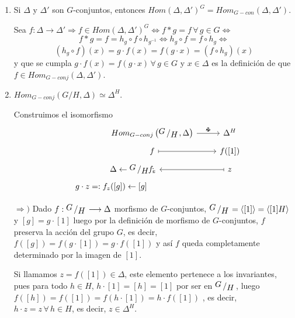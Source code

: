 \begin{enumerate}
\begin{dem}
        $$ \{\text{ptos. racionales de } L\underset{k}{\otimes} L \}  = Hom_{L-alg}(L\underset{k}{\otimes} L,L ) = Hom_{k-alg}(L,L) = G$$
    \end{dem}
    \item Si $\Delta$ y $\Delta'$ son $G$-conjuntos, entonces $Hom(\Delta, \Delta')^G = Hom_{G-con}(\Delta, \Delta')$.
    \begin{dem}
        Sea $f: \Delta \longrightarrow \Delta' \Rightarrow f\in Hom( \Delta, \Delta')^G \iff f*g=f \, \forall \, g\in G \iff$
        $$f*g=f=h_g \circ f \circ h_{g^{-1}}  \iff h_g \circ f = f \circ h_g \iff$$
        $$(h_g \circ f)(x) = g\cdot f(x) = f(g\cdot x) = (f\circ h_g)(x) $$
        y que se cumpla $g\cdot f(x) = f(g\cdot x) \, \forall \, g \in G$ y $x \in \Delta$ es la definici\'on de que $f\in Hom_{G-conj}(\Delta, \Delta')$.
    \end{dem}
    \item $Hom_{G-conj} (G/H, \Delta) \simeq \Delta^H$.
    \begin{dem}
        Construimos el isomorfismo
        $$\bt &[-30mm] Hom_{G-conj}\left(\modulo{G}{H}, \Delta \right) \rar{\Phi}{\sim} & \Delta^H \\[-5mm]
        &[-8mm] f\rarmaps & f({[1]}) \\[-5mm] 
        \hspace{18mm} \Delta \leftarrow \modulo{G}{H} : &[6mm] f_z & z\arrow[mapsto]{l} \\[-5mm] 
        g\cdot z = : f_z({[g]}) \leftarrow [g] &[-15mm]  \et$$

        $\Rightarrow)$ Dado $f : \modulo{G}{H} \longrightarrow \Delta$ morfismo de $G$-conjuntos, $\modulo{G}{H} = \langle [1]\rangle = \langle [1] H\rangle$ y $[g] = g\cdot [1]$ luego por la definici\'on de morfismo de $G$-conjuntos, $f$ preserva la acci\'on del grupo $G$, es decir, $f([g]) = f(g\cdot [1]) = g\cdot f([1])$ y as\'i $f$ queda completamente determinado por la imagen de $[1]$. 

        Si llamamos $z=f([1])\in \Delta$, este elemento pertenece a los invariantes, pues para todo $h \in H$, 
        $h\cdot [1] = [h] =[1]$ por ser en $\modulo{G}{H}$, luego $f([h]) = f([1]) = f(h\cdot [1]) = h \cdot f([1])$ , es decir, $h \cdot z = z \, \forall \, h\in H$, es decir, $z\in \Delta^H$.


\end{dem}
\end{enumerate}
